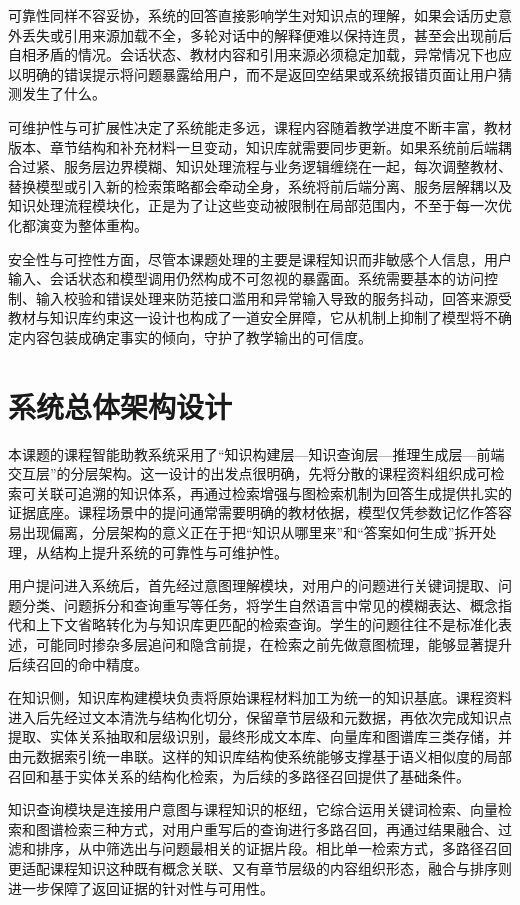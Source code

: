 可靠性同样不容妥协，系统的回答直接影响学生对知识点的理解，如果会话历史意外丢失或引用来源加载不全，多轮对话中的解释便难以保持连贯，甚至会出现前后自相矛盾的情况。会话状态、教材内容和引用来源必须稳定加载，异常情况下也应以明确的错误提示将问题暴露给用户，而不是返回空结果或系统报错页面让用户猜测发生了什么。

可维护性与可扩展性决定了系统能走多远，课程内容随着教学进度不断丰富，教材版本、章节结构和补充材料一旦变动，知识库就需要同步更新。如果系统前后端耦合过紧、服务层边界模糊、知识处理流程与业务逻辑缠绕在一起，每次调整教材、替换模型或引入新的检索策略都会牵动全身，系统将前后端分离、服务层解耦以及知识处理流程模块化，正是为了让这些变动被限制在局部范围内，不至于每一次优化都演变为整体重构。

安全性与可控性方面，尽管本课题处理的主要是课程知识而非敏感个人信息，用户输入、会话状态和模型调用仍然构成不可忽视的暴露面。系统需要基本的访问控制、输入校验和错误处理来防范接口滥用和异常输入导致的服务抖动，回答来源受教材与知识库约束这一设计也构成了一道安全屏障，它从机制上抑制了模型将不确定内容包装成确定事实的倾向，守护了教学输出的可信度。

\section{系统总体架构设计}
本课题的课程智能助教系统采用了“知识构建层—知识查询层—推理生成层—前端交互层”的分层架构。这一设计的出发点很明确，先将分散的课程资料组织成可检索可关联可追溯的知识体系，再通过检索增强与图检索机制为回答生成提供扎实的证据底座。课程场景中的提问通常需要明确的教材依据，模型仅凭参数记忆作答容易出现偏离，分层架构的意义正在于把“知识从哪里来”和“答案如何生成”拆开处理，从结构上提升系统的可靠性与可维护性。

用户提问进入系统后，首先经过意图理解模块，对用户的问题进行关键词提取、问题分类、问题拆分和查询重写等任务，将学生自然语言中常见的模糊表达、概念指代和上下文省略转化为与知识库更匹配的检索查询。学生的问题往往不是标准化表述，可能同时掺杂多层追问和隐含前提，在检索之前先做意图梳理，能够显著提升后续召回的命中精度。

在知识侧，知识库构建模块负责将原始课程材料加工为统一的知识基底。课程资料进入后先经过文本清洗与结构化切分，保留章节层级和元数据，再依次完成知识点提取、实体关系抽取和层级识别，最终形成文本库、向量库和图谱库三类存储，并由元数据索引统一串联。这样的知识库结构使系统能够支撑基于语义相似度的局部召回和基于实体关系的结构化检索，为后续的多路径召回提供了基础条件。

知识查询模块是连接用户意图与课程知识的枢纽，它综合运用关键词检索、向量检索和图谱检索三种方式，对用户重写后的查询进行多路召回，再通过结果融合、过滤和排序，从中筛选出与问题最相关的证据片段。相比单一检索方式，多路径召回更适配课程知识这种既有概念关联、又有章节层级的内容组织形态，融合与排序则进一步保障了返回证据的针对性与可用性。

